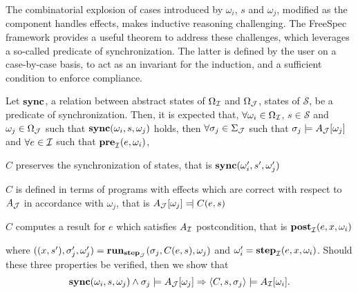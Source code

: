 The combinatorial explosion of cases introduced by $\omega_i$, $s$ and
$\omega_j$, modified as the component handles effects, makes inductive
reasoning challenging.
%
The FreeSpec framework provides a useful theorem to address these challenges,
which leverages a so-called predicate of synchronization.
%
The latter is defined by the user on a case-by-case basis, to act as an
invariant for the induction, and a sufficient condition to enforce compliance.

\begin{theorem} \label{theorem:der-compliance}
  Let $\mathbf{\mathbf{sync}}$, a relation between abstract states of $\Omega_{\mathcal{I}}$ and
  $\Omega_{\mathcal{J}}$, states of $\mathcal{S}$, be a predicate of
  synchronization.
  Then, it is expected that, $\forall \omega_i \in \Omega_{\mathcal{I}}$, $s \in
  \mathcal{S}$ and $\omega_j \in \Omega_{\mathcal{J}}$ such that
  $\mathbf{\mathbf{sync}}(\omega_i, s, \omega_j)$ holds, then $\forall \sigma_j \in
  \Sigma_{\mathcal{J}}$ such that $\sigma_j \models A_{\mathcal{J}}[\omega_j]$
  and $\forall e \in \mathcal{I}$ such that $\mathbf{\mathbf{pre}}_{\mathcal{I}}(e, \omega_i)$,
  \begin{compactenum}
  \item $C$ preserves the synchronization of states, that is
    $\mathbf{\mathbf{sync}}(\omega_i', s', \omega_j')$
  \item $C$ is defined in terms of programs with effects which are correct with
    respect to $A_{\mathcal{J}}$ in accordance with $\omega_j$, that is
    $A_{\J}[\omega_j] \modelssym C(e, s)$
  \item $C$ computes a result for $e$ which satisfies $A_{\mathcal{I}}$ postcondition,
     that is $\mathbf{\mathbf{post}}_{\mathcal{I}}(e, x, \omega_i)$
  \end{compactenum}
  where
  $((x, s'), \sigma_j', \omega_j') = \mathbf{\mathbf{run}}_{\mathbf{\mathbf{step}}_{\mathcal{J}}}(\sigma_j,
  C(e, s), \omega_j)$ and
  $\omega_i' = \mathbf{\mathbf{step}}_{\mathcal{I}}(e, x, \omega_i)$.
  Should these three properties be verified, then we show that
  \[ \mathbf{\mathbf{sync}}(\omega_i, s, \omega_j) \wedge \sigma_j \models
    A_{\mathcal{J}}[\omega_j] \Rightarrow \langle C, s, \sigma_j \rangle \models
    A_{\mathcal{I}}[\omega_i].
  \]
\end{theorem}

